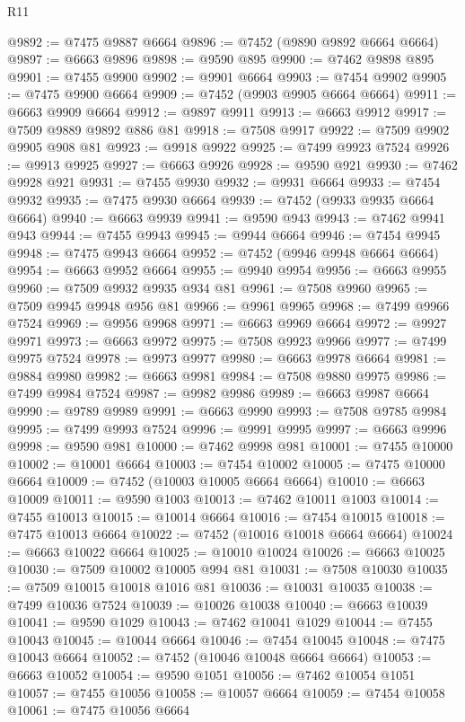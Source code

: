 \begin{lexlean}{R11}
\begin{coremodule}
{{{{{{{{{{{{{{{{{{{{{{{{{{{{{{{{{{{{{{{{{{{{{{{{{{{{{{{{{{{{{{{{{{{{{{{{{{{{{{{{{{@9892 := @7475 @9887 @6664
@9896 := @7452 (@9890 @9892 @6664 @6664)
@9897 := @6663 @9896
@9898 := @9590 @895
@9900 := @7462 @9898 @895
@9901 := @7455 @9900
@9902 := @9901 @6664
@9903 := @7454 @9902
@9905 := @7475 @9900 @6664
@9909 := @7452 (@9903 @9905 @6664 @6664)
@9911 := @6663 @9909 @6664
@9912 := @9897 @9911
@9913 := @6663 @9912
@9917 := @7509 @9889 @9892 @886 @81
@9918 := @7508 @9917
@9922 := @7509 @9902 @9905 @908 @81
@9923 := @9918 @9922
@9925 := @7499 @9923 @7524
@9926 := @9913 @9925
@9927 := @6663 @9926
@9928 := @9590 @921
@9930 := @7462 @9928 @921
@9931 := @7455 @9930
@9932 := @9931 @6664
@9933 := @7454 @9932
@9935 := @7475 @9930 @6664
@9939 := @7452 (@9933 @9935 @6664 @6664)
@9940 := @6663 @9939
@9941 := @9590 @943
@9943 := @7462 @9941 @943
@9944 := @7455 @9943
@9945 := @9944 @6664
@9946 := @7454 @9945
@9948 := @7475 @9943 @6664
@9952 := @7452 (@9946 @9948 @6664 @6664)
@9954 := @6663 @9952 @6664
@9955 := @9940 @9954
@9956 := @6663 @9955
@9960 := @7509 @9932 @9935 @934 @81
@9961 := @7508 @9960
@9965 := @7509 @9945 @9948 @956 @81
@9966 := @9961 @9965
@9968 := @7499 @9966 @7524
@9969 := @9956 @9968
@9971 := @6663 @9969 @6664
@9972 := @9927 @9971
@9973 := @6663 @9972
@9975 := @7508 @9923 @9966
@9977 := @7499 @9975 @7524
@9978 := @9973 @9977
@9980 := @6663 @9978 @6664
@9981 := @9884 @9980
@9982 := @6663 @9981
@9984 := @7508 @9880 @9975
@9986 := @7499 @9984 @7524
@9987 := @9982 @9986
@9989 := @6663 @9987 @6664
@9990 := @9789 @9989
@9991 := @6663 @9990
@9993 := @7508 @9785 @9984
@9995 := @7499 @9993 @7524
@9996 := @9991 @9995
@9997 := @6663 @9996
@9998 := @9590 @981
@10000 := @7462 @9998 @981
@10001 := @7455 @10000
@10002 := @10001 @6664
@10003 := @7454 @10002
@10005 := @7475 @10000 @6664
@10009 := @7452 (@10003 @10005 @6664 @6664)
@10010 := @6663 @10009
@10011 := @9590 @1003
@10013 := @7462 @10011 @1003
@10014 := @7455 @10013
@10015 := @10014 @6664
@10016 := @7454 @10015
@10018 := @7475 @10013 @6664
@10022 := @7452 (@10016 @10018 @6664 @6664)
@10024 := @6663 @10022 @6664
@10025 := @10010 @10024
@10026 := @6663 @10025
@10030 := @7509 @10002 @10005 @994 @81
@10031 := @7508 @10030
@10035 := @7509 @10015 @10018 @1016 @81
@10036 := @10031 @10035
@10038 := @7499 @10036 @7524
@10039 := @10026 @10038
@10040 := @6663 @10039
@10041 := @9590 @1029
@10043 := @7462 @10041 @1029
@10044 := @7455 @10043
@10045 := @10044 @6664
@10046 := @7454 @10045
@10048 := @7475 @10043 @6664
@10052 := @7452 (@10046 @10048 @6664 @6664)
@10053 := @6663 @10052
@10054 := @9590 @1051
@10056 := @7462 @10054 @1051
@10057 := @7455 @10056
@10058 := @10057 @6664
@10059 := @7454 @10058
@10061 := @7475 @10056 @6664
}}}}}}}}}}}}}}}}}}}}}}}}}}}}}}}}}}}}}}}}}}}}}}}}}}}}}}}}}}}}}}}}}}}}}}}}}}}}}}}}}}
\end{coremodule}
\end{lexlean}
